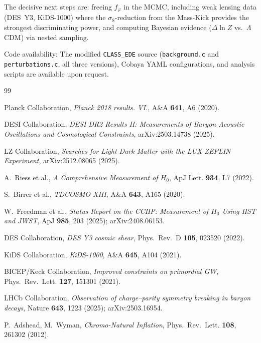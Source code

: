 \documentclass[a4paper,11pt]{article}
\newcommand{\LCDM}{$\Lambda$CDM}
\newcommand{\fphi}{f_\varphi}
\begin{document}
The decisive next steps are: freeing $\fphi$ in the MCMC, including weak lensing data (DES~Y3, KiDS-1000) where the $\sigma_8$-reduction from the Mass-Kick provides the strongest discriminating power, and computing Bayesian evidence ($\Delta\ln Z$ vs.\ \LCDM) via nested sampling.

Code availability: The modified \texttt{CLASS\_EDE} source (\texttt{background.c} and \texttt{perturbations.c}, all three versions), Cobaya YAML configurations, and analysis scripts are available upon request.


\begin{thebibliography}{99}

 Planck Collaboration, \textit{Planck 2018 results. VI.}, A\&A \textbf{641}, A6 (2020).

 DESI Collaboration, \textit{DESI DR2 Results II: Measurements of Baryon Acoustic Oscillations and Cosmological Constraints}, arXiv:2503.14738 (2025).

 LZ Collaboration, \textit{Searches for Light Dark Matter with the LUX-ZEPLIN Experiment}, arXiv:2512.08065 (2025).

 A.~Riess et al., \textit{A Comprehensive Measurement of $H_0$}, ApJ Lett. \textbf{934}, L7 (2022).

 S.~Birrer et al., \textit{TDCOSMO XIII}, A\&A \textbf{643}, A165 (2020).

 W.~Freedman et al., \textit{Status Report on the CCHP: Measurement of $H_0$ Using HST and JWST}, ApJ \textbf{985}, 203 (2025); arXiv:2408.06153.

 DES Collaboration, \textit{DES Y3 cosmic shear}, Phys.\ Rev.\ D \textbf{105}, 023520 (2022).

 KiDS Collaboration, \textit{KiDS-1000}, A\&A \textbf{645}, A104 (2021).

 BICEP/Keck Collaboration, \textit{Improved constraints on primordial GW}, Phys.\ Rev.\ Lett. \textbf{127}, 151301 (2021).

 LHCb Collaboration, \textit{Observation of charge--parity symmetry breaking in baryon decays}, Nature \textbf{643}, 1223 (2025); arXiv:2503.16954.

 P.~Adshead, M.~Wyman, \textit{Chromo-Natural Inflation}, Phys.\ Rev.\ Lett. \textbf{108}, 261302 (2012).


\end{thebibliography}
\end{document}
